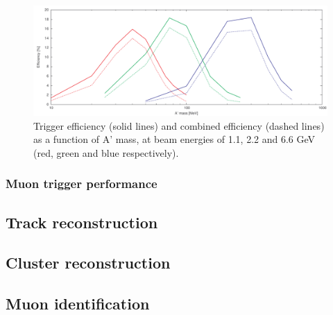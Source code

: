 \begin{figure}[ht]
	\includegraphics[width=\textwidth]{performance/ap_eff}
	\caption{\small{Trigger efficiency (solid lines) and combined efficiency (dashed lines) as a function of A' mass, at beam energies of 1.1, 2.2 and 6.6 GeV (red, green and blue respectively).}}
	\label{fig:trigeff}
\end{figure}

\subsubsection{Muon trigger performance}

\subsection{Track reconstruction}

\subsection{Cluster reconstruction}

\subsection{Muon identification}

